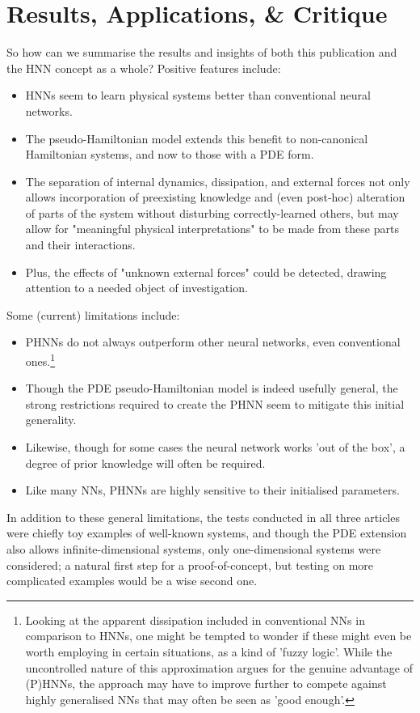 \documentclass[10 pt, a4paper]{article}
\begin{document}
\section{Results, Applications, \& Critique}
So how can we summarise the results and insights of both this publication and the HNN concept as a whole? Positive features include:
\begin{itemize}
	\item HNNs seem to learn physical systems better than conventional neural networks.
	\item The pseudo-Hamiltonian model extends this benefit to non-canonical Hamiltonian systems, and now to those with a PDE form.
	\item The separation of internal dynamics, dissipation, and external forces not only allows incorporation of preexisting knowledge and (even post-hoc) alteration of parts of the system without disturbing correctly-learned others, but may allow for "meaningful physical interpretations"\cite{phnn} to be made from these parts and their interactions.
	\item Plus, the effects of "unknown external forces"\cite{phnn} could be detected, drawing attention to a needed object of investigation.
\end{itemize}
Some (current) limitations include:
\begin{itemize}
	\item PHNNs do not always outperform other neural networks, even conventional ones.\footnote{Looking at the apparent dissipation included in conventional NNs in comparison to HNNs, one might be tempted to wonder if these might even be worth employing in certain situations, as a kind of 'fuzzy logic'. While the uncontrolled nature of this approximation argues for the genuine advantage of (P)HNNs, the approach may have to improve further to compete against highly generalised NNs that may often be seen as 'good enough'.}
	\item Though the PDE pseudo-Hamiltonian model is indeed usefully general, the strong restrictions required to create the PHNN seem to mitigate this initial generality.
	\item Likewise, though for some cases the neural network works 'out of the box', a degree of prior knowledge will often be required.
	\item Like many NNs, PHNNs are highly sensitive to their initialised parameters.
\end{itemize}
In addition to these general limitations, the tests conducted in all three articles were chiefly toy examples of well-known systems, and though the PDE extension also allows infinite-dimensional systems, only one-dimensional systems were considered; a natural first step for a proof-of-concept, but testing on more complicated examples would be a wise second one.\\
\end{document}
